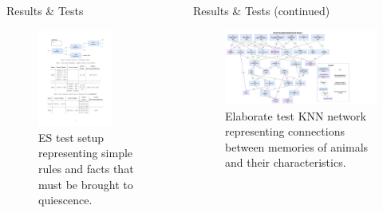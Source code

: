 \documentclass[final]{beamer} %
\newlength{\columnheight}
\begin{document}
\begin{frame}
\begin{columns}
\begin{column}{.35\textwidth}
{\begin{block}{Results \& Tests}
					\begin{figure}[!htb]
						\centering
						\includegraphics[width=0.7\textwidth]{figures/testES.pdf}
						\caption
						{ES test setup representing simple rules and facts that must be brought to quiescence.}
					\end{figure}
				\end{block}
				}
			\end{column}
			\begin{column}{.3\textwidth}
				\parbox[t][\columnheight]{\textwidth}{
				\begin{block}{Results \& Tests (continued)}
					\begin{figure}[!htb]
						\centering
						\includegraphics[width=\textwidth]{figures/animal_knn.pdf}
						\caption
						{Elaborate test KNN network representing connections between memories of animals and their characteristics.}
					\end{figure}
					

\end{block}}
\end{column}
\end{columns}
\end{frame}
\end{document}
